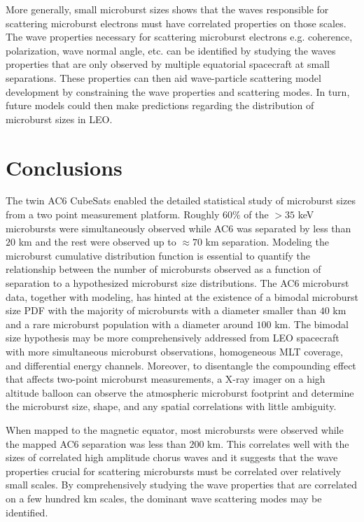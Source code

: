 \documentclass[draft]{agujournal2019}
\begin{document}
More generally, small microburst sizes shows that the waves responsible for scattering microburst electrons must have correlated properties on those scales. The wave properties necessary for scattering microburst electrons e.g. coherence, polarization, wave normal angle, etc. can be identified by studying the waves properties that are only observed by multiple equatorial spacecraft at small separations. These properties can then aid wave-particle scattering model development by constraining the wave properties and scattering modes. In turn, future models could then make predictions regarding the distribution of microburst sizes in LEO. 

\section{Conclusions}
The twin AC6 CubeSats enabled the detailed statistical study of microburst sizes from a two point measurement platform. Roughly $60 \%$ of the $> 35$ keV microbursts were simultaneously observed while AC6 was separated by less than $20$ km and the rest were observed up to $\approx 70$ km separation. Modeling the microburst cumulative distribution function is essential to quantify the relationship between the number of microbursts observed as a function of separation to a hypothesized microburst size distributions. The AC6 microburst data, together with modeling, has hinted at the existence of a bimodal microburst size PDF with the majority of microbursts with a diameter smaller than $40$ km and a rare microburst population with a diameter around $100$ km. The bimodal size hypothesis may be more comprehensively addressed from LEO spacecraft with more simultaneous microburst observations, homogeneous MLT coverage, and differential energy channels. Moreover, to disentangle the compounding effect that affects two-point microburst measurements, a X-ray imager on a high altitude balloon can observe the atmospheric microburst footprint and determine the microburst size, shape, and any spatial correlations with little ambiguity. 

When mapped to the magnetic equator, most microbursts were observed while the mapped AC6 separation was less than $200$ km. This correlates well with the sizes of correlated high amplitude chorus waves and it suggests that the wave properties crucial for scattering microbursts must be correlated over relatively small scales. By comprehensively studying the wave properties that are correlated on a few hundred km scales, the dominant wave scattering modes may be identified.
\end{document}
